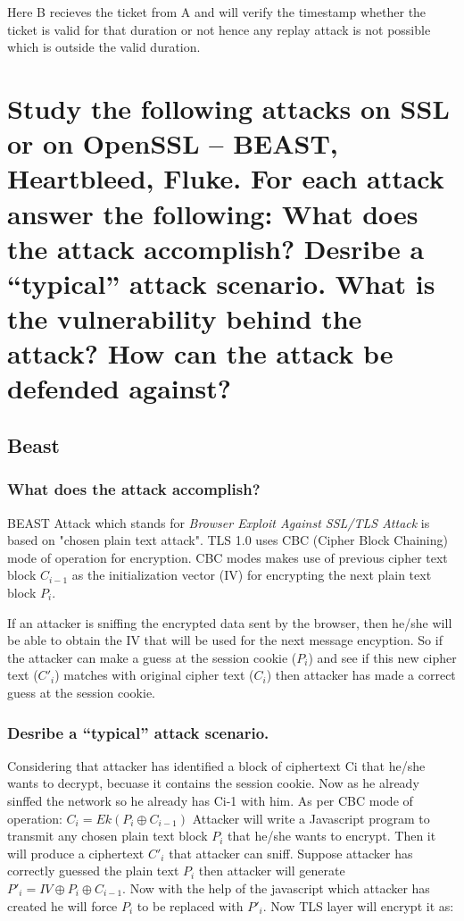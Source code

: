 \documentclass{article}
\begin{document}
 
 Here B recieves the ticket from A and will verify the timestamp whether the ticket is valid for that duration or not hence any replay attack is not possible which is outside the valid duration.
 

 
 

 
\section{Study the following attacks on SSL or on OpenSSL – BEAST, Heartbleed, Fluke. For each
attack answer the following:
What does the attack accomplish?
Desribe a “typical” attack scenario.
What is the vulnerability behind the attack?
How can the attack be defended against?}

\subsection{Beast}
\subsubsection{What does the attack accomplish?}

\indent \indent BEAST Attack which stands for {\it Browser Exploit Against SSL/TLS Attack} is based on "chosen plain text attack". TLS 1.0 uses CBC (Cipher Block Chaining) mode of operation for encryption. CBC modes makes use of previous cipher text block  $C_{i-1}$ as the initialization vector (IV) for encrypting the next plain text block $P_{i}$.

If an attacker is sniffing the encrypted data sent by the browser, then he/she will be able to obtain the IV that will be used for the next message encyption. So if the attacker can make a guess at the session cookie ($P_{i}$) and see if this new  cipher text ($C'_{i}$)
matches with original cipher text ($C_{i}$) then attacker has made a correct guess at the session cookie.

\subsubsection{Desribe a “typical” attack scenario.}
\indent \indent Considering that attacker has identified a  block of ciphertext Ci that he/she wants to decrypt, becuase it contains the session cookie. Now as he already sinffed the network so he already has Ci-1 with him.
As per CBC mode of operation: $C_i=Ek(P_i \oplus C_{i-1})$
Attacker will write a Javascript program to transmit any chosen plain text block $P_i$ that he/she wants to encrypt. Then it will produce a ciphertext $C'_i$ that attacker can sniff.
Suppose attacker has correctly guessed the plain text $P_i$ then attacker will generate $P'_i= IV \oplus P_i \oplus C_{i-1}$. Now with the help of the javascript which attacker has created he will force $P_i$ to be replaced with $P'_i$. Now TLS layer will encrypt it as: \\ 
\end{document}
